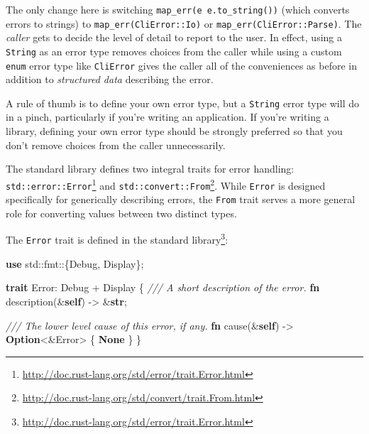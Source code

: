 \documentclass[a4paper,]{book}
\newenvironment{Shaded}{\begin{snugshade}}{\end{snugshade}}
\newcommand{\KeywordTok}[1]{\textcolor[rgb]{0.13,0.29,0.53}{\textbf{{#1}}}}
\newcommand{\CommentTok}[1]{\textcolor[rgb]{0.56,0.35,0.01}{\textit{{#1}}}}
\newcommand{\NormalTok}[1]{{#1}}
\renewcommand{\href}[2]{#2\footnote{\url{#1}}}
\begin{document}
The only change here is switching
\texttt{map\_err(\textbar{}e\textbar{}\ e.to\_string())} (which converts
errors to strings) to \texttt{map\_err(CliError::Io)} or
\texttt{map\_err(CliError::Parse)}. The \emph{caller} gets to decide the
level of detail to report to the user. In effect, using a
\texttt{String} as an error type removes choices from the caller while
using a custom \texttt{enum} error type like \texttt{CliError} gives the
caller all of the conveniences as before in addition to \emph{structured
data} describing the error.

A rule of thumb is to define your own error type, but a \texttt{String}
error type will do in a pinch, particularly if you're writing an
application. If you're writing a library, defining your own error type
should be strongly preferred so that you don't remove choices from the
caller unnecessarily.


The standard library defines two integral traits for error handling:
\href{http://doc.rust-lang.org/std/error/trait.Error.html}{\texttt{std::error::Error}}
and
\href{http://doc.rust-lang.org/std/convert/trait.From.html}{\texttt{std::convert::From}}.
While \texttt{Error} is designed specifically for generically describing
errors, the \texttt{From} trait serves a more general role for
converting values between two distinct types.


The \texttt{Error} trait is
\href{http://doc.rust-lang.org/std/error/trait.Error.html}{defined in
the standard library}:

\begin{Shaded}
\begin{Highlighting}[]
\KeywordTok{use} \NormalTok{std::fmt::\{Debug, Display\};}

\KeywordTok{trait} \NormalTok{Error: Debug + Display \{}
  \CommentTok{/// A short description of the error.}
  \KeywordTok{fn} \NormalTok{description(&}\KeywordTok{self}\NormalTok{) -> &}\KeywordTok{str}\NormalTok{;}

  \CommentTok{/// The lower level cause of this error, if any.}
  \KeywordTok{fn} \NormalTok{cause(&}\KeywordTok{self}\NormalTok{) -> }\KeywordTok{Option}\NormalTok{<&Error> \{ }\KeywordTok{None} \NormalTok{\}}
\NormalTok{\}}
\end{Highlighting}
\end{Shaded}
\end{document}
